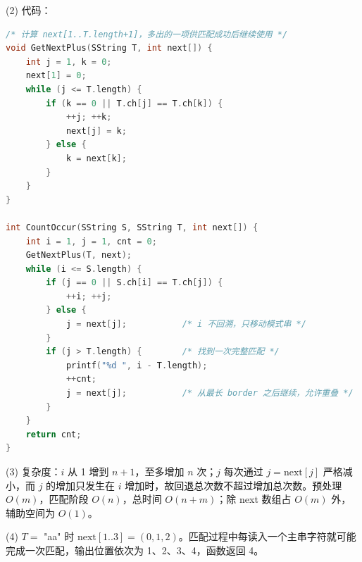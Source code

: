 \begin{enumerate}[resume]
(2) 代码：
\begin{lstlisting}[language=C]
/* 计算 next[1..T.length+1]，多出的一项供匹配成功后继续使用 */
void GetNextPlus(SString T, int next[]) {
    int j = 1, k = 0;
    next[1] = 0;
    while (j <= T.length) {
        if (k == 0 || T.ch[j] == T.ch[k]) {
            ++j; ++k;
            next[j] = k;
        } else {
            k = next[k];
        }
    }
}

int CountOccur(SString S, SString T, int next[]) {
    int i = 1, j = 1, cnt = 0;
    GetNextPlus(T, next);
    while (i <= S.length) {
        if (j == 0 || S.ch[i] == T.ch[j]) {
            ++i; ++j;
        } else {
            j = next[j];           /* i 不回溯，只移动模式串 */
        }
        if (j > T.length) {        /* 找到一次完整匹配 */
            printf("%d ", i - T.length);
            ++cnt;
            j = next[j];           /* 从最长 border 之后继续，允许重叠 */
        }
    }
    return cnt;
}
\end{lstlisting}

(3) 复杂度：$i$ 从 1 增到 $n+1$，至多增加 $n$ 次；$j$ 每次通过 $j=\mathrm{next}[j]$ 严格减小，而 $j$ 的增加只发生在 $i$ 增加时，故回退总次数不超过增加总次数。预处理 $O(m)$，匹配阶段 $O(n)$，总时间 $O(n+m)$；除 next 数组占 $O(m)$ 外，辅助空间为 $O(1)$。

(4) $T=$ "aa" 时 $\mathrm{next}[1..3]=(0,1,2)$。匹配过程中每读入一个主串字符就可能完成一次匹配，输出位置依次为 1、2、3、4，函数返回 4。
\else \answerarea[10] \fi

\end{enumerate}

\vspace{8pt}
